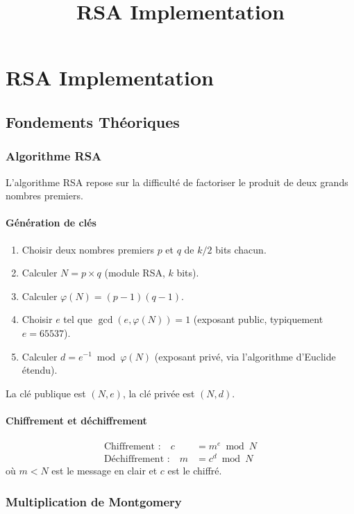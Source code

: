 \documentclass[12pt,a4paper]{report}
\title{RSA Implementation}
\author{}
\date{}
\begin{document}
\chapter{RSA Implementation}


\section{Fondements Théoriques}
\label{ch:theory}

\subsection{Algorithme RSA}
L'algorithme RSA repose sur la difficulté de factoriser le produit de
deux grands nombres premiers.

\subsubsection{Génération de clés}
\begin{enumerate}
  \item Choisir deux nombres premiers $p$ et $q$ de $k/2$ bits chacun.
  \item Calculer $N = p \times q$ \quad (module RSA, $k$ bits).
  \item Calculer $\varphi(N) = (p-1)(q-1)$.
  \item Choisir $e$ tel que $\gcd(e, \varphi(N)) = 1$ (exposant public,
        typiquement $e = 65537$).
  \item Calculer $d = e^{-1} \bmod \varphi(N)$ (exposant privé, via
        l'algorithme d'Euclide étendu).
\end{enumerate}
La clé publique est $(N, e)$, la clé privée est $(N, d)$.

\subsubsection{Chiffrement et déchiffrement}
\begin{align}
  \text{Chiffrement :} \quad c &= m^e \bmod N \\
  \text{Déchiffrement :} \quad m &= c^d \bmod N
\end{align}
où $m < N$ est le message en clair et $c$ est le chiffré.


\subsection{Multiplication de Montgomery}
\end{document}
